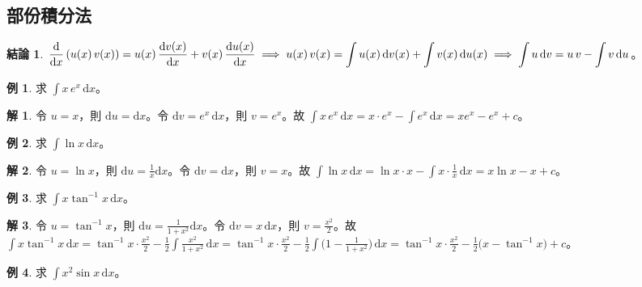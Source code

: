 \documentclass[12pt]{extarticle}
\newcommand{\ds}{\displaystyle}
\newcommand{\ie}{\;\Longrightarrow\;}
\theoremstyle{definition}
\newtheorem*{fact}{結論}
\newtheorem*{ex}{例}
\newtheorem*{sol}{解}
\newcommand{\myline}{\noindent\makebox[\linewidth]{\rule{\paperwidth}{0.4pt}}}
\begin{document}
\myline

\subsection*{部份積分法}

\begin{fact}
  $\ds\frac{\mathrm{d}}{\mathrm{d}x}\,(u(x)\,v(x)) = u(x)\,\frac{\mathrm{d}v(x)}{\mathrm{d}x} + v(x)\,\frac{\mathrm{d}u(x)}{\mathrm{d}x}\ie u(x)\,v(x) = \int u(x)\,\mathrm{d}v(x) + \int v(x)\,\mathrm{d}u(x) \\ \ie \int u\,\text{d}v = u\,v - \int v\,\text{d}u$。
\end{fact}

\begin{ex}
  求 $\ds\int x\, e^{x}\,\mathrm{d}x$。
\end{ex}

\begin{sol}
  令 $u = x$，則 $\ds\mathrm{d}u = \mathrm{d}x$。令 $\ds\mathrm{d}v = e^x\,\mathrm{d}x$，則 $\ds v = e^x$。故 $\ds\int x\, e^{x}\,\mathrm{d}x = x\cdot e^x - \int e^x\,\mathrm{d}x = xe^x - e^x + c$。
\end{sol}
    
\begin{ex}
  求 $\ds\int\!\ln x\,\mathrm{d}x$。
\end{ex}

\begin{sol}
  令 $\ds u = \ln x$，則 $\ds\mathrm{d}u = \frac{1}{x}\mathrm{d}x$。令 $\ds\mathrm{d}v = \mathrm{d}x$，則 $v = x$。故 $\ds\int\!\ln x\,\mathrm{d}x = \ln x \cdot x - \int x\cdot\frac{1}{x}\,\mathrm{d}x = x\ln x - x + c$。
\end{sol}

\begin{ex}
  求 $\ds\int x\tan^{-1} x\,\mathrm{d}x$。
\end{ex}

\begin{sol}
  令 $\ds u = \tan^{-1} x$，則 $\ds\mathrm{d}u = \frac{1}{1 + x^2}\mathrm{d}x$。令 $\ds\mathrm{d}v = x\,\mathrm{d}x$，則 $\ds v = \frac{x^2}{2}$。故 $\ds\int x\tan^{-1} x\,\mathrm{d}x = \tan^{-1} x\cdot\frac{x^2}{2} - \frac{1}{2}\int\!\frac{x^2}{1 + x^2}\,\mathrm{d}x = \tan^{-1} x\cdot\frac{x^2}{2} - \frac{1}{2}\int\!\big(1 - \frac{1}{1 + x^2}\big)\,\mathrm{d}x = \tan^{-1}x \cdot\frac{x^2}{2} - \frac{1}{2}\big(x - \tan^{-1} x\big) + c$。
\end{sol}

\begin{ex}
  求 $\ds\int\!x^2\sin x\,\mathrm{d}x$。
\end{ex}
\end{document}
